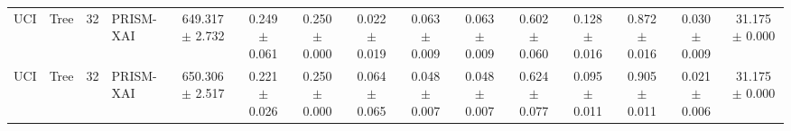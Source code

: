 \begin{table}[t]
\begin{tabular}{llllccccccccccc}
UCI & Tree & 32 & PRISM-XAI & 649.317 $\pm$ 2.732 & 0.249 $\pm$ 0.061 & 0.250 $\pm$ 0.000 & 0.022 $\pm$ 0.019 & 0.063 $\pm$ 0.009 & 0.063 $\pm$ 0.009 & 0.602 $\pm$ 0.060 & 0.128 $\pm$ 0.016 & 0.872 $\pm$ 0.016 & 0.030 $\pm$ 0.009 & 31.175 $\pm$ 0.000 \\
UCI & Tree & 32 & PRISM-XAI & 650.306 $\pm$ 2.517 & 0.221 $\pm$ 0.026 & 0.250 $\pm$ 0.000 & 0.064 $\pm$ 0.065 & 0.048 $\pm$ 0.007 & 0.048 $\pm$ 0.007 & 0.624 $\pm$ 0.077 & 0.095 $\pm$ 0.011 & 0.905 $\pm$ 0.011 & 0.021 $\pm$ 0.006 & 31.175 $\pm$ 0.000 \\
\bottomrule
\end{tabular}
\end{table}
